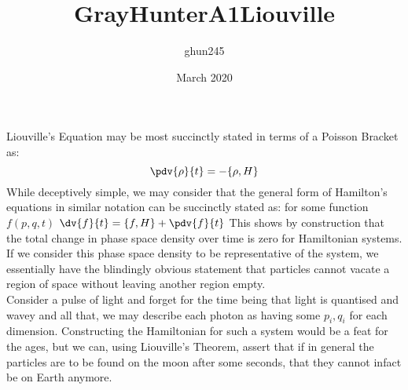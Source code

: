 \documentclass{article}
\title{GrayHunterA1Liouville}
\author{ghun245 }
\date{March 2020}
\begin{document}
\maketitle

Liouville's Equation may be most succinctly stated in terms of a Poisson Bracket as:
$$
\pdv{\rho}{t} = -\{\rho,H\}
$$
While deceptively simple, we may consider that the general form of Hamilton's equations in similar notation can be succinctly stated as: for some function $f(p,q,t)$ $\dv{f}{t} = \{f,H \} + \pdv{f}{t}$ This shows by construction that the total change in phase space density over time is zero for Hamiltonian systems. If we consider this phase space density to be representative of the system, we essentially have the blindingly obvious statement that particles cannot vacate a region of space without leaving another region empty. \\
Consider a pulse of light and forget for the time being that light is quantised and wavey and all that, we may describe each photon as having some $p_i, q_i$ for each dimension. Constructing the Hamiltonian for such a system would be a feat for the ages, but we can, using Liouville's Theorem, assert that if in general the particles are to be found on the moon after some seconds, that they cannot infact be on Earth anymore.
\end{document}
